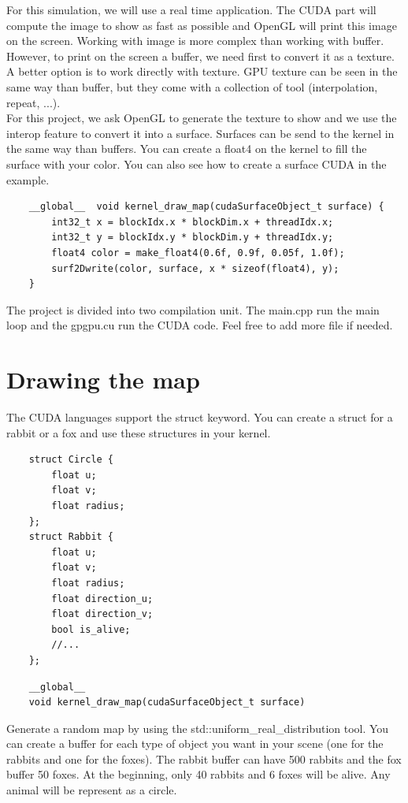 \documentclass{article}
\begin{document}
For this simulation, we will use a real time application. The CUDA part will compute the image to show as fast as possible and OpenGL will print this image on the screen. Working with image is more complex than working with buffer. However, to print on the screen a buffer, we need first to convert it as a texture. A better option is to work directly with texture. GPU texture can be seen in the same way than buffer, but they come with a collection of tool (interpolation, repeat, ...).\\
For this project, we ask OpenGL to generate the texture to show and we use the interop feature to convert it into a surface. Surfaces can be send to the kernel in the same way than buffers. You can create a float4 on the kernel to fill the surface with your color. You can also see how to create a surface CUDA in the example.
\begin{lstlisting}
	__global__  void kernel_draw_map(cudaSurfaceObject_t surface) {
		int32_t x = blockIdx.x * blockDim.x + threadIdx.x;
		int32_t y = blockIdx.y * blockDim.y + threadIdx.y;
		float4 color = make_float4(0.6f, 0.9f, 0.05f, 1.0f);
		surf2Dwrite(color, surface, x * sizeof(float4), y);
	}
\end{lstlisting}
The project is divided into two compilation unit. The main.cpp run the main loop and the gpgpu.cu run the CUDA code. Feel free to add more file if needed.

\newpage
\section{Drawing the map}
The CUDA languages support the struct keyword. You can create a struct for a rabbit or a fox and use these structures in your kernel.
\begin{lstlisting}
	struct Circle {
		float u;
		float v;
		float radius;
	};
	struct Rabbit {
		float u;
		float v;
		float radius;
		float direction_u;
		float direction_v;
		bool is_alive;
		//...
	};
\end{lstlisting}
\begin{lstlisting}
	__global__ 
	void kernel_draw_map(cudaSurfaceObject_t surface)
\end{lstlisting}
Generate a random map by using the std::uniform\_real\_distribution tool. You can create a buffer for each type of object you want in your scene (one for the rabbits and one for the foxes). The rabbit buffer can have 500 rabbits and the fox buffer 50 foxes. At the beginning, only 40 rabbits and 6 foxes will be alive. Any animal will be represent as a circle.
\end{document}
